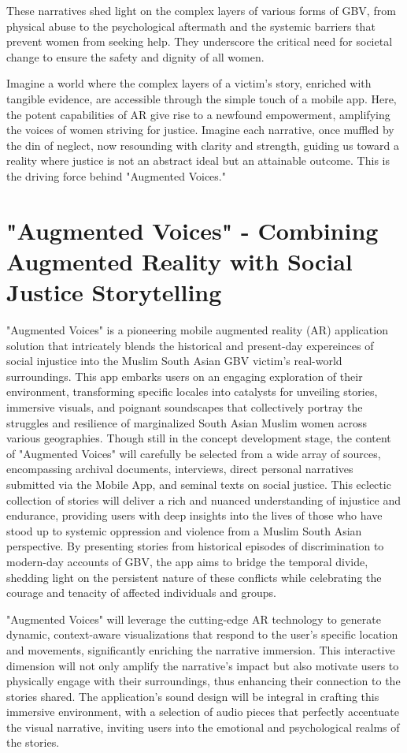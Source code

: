 \documentclass[manuscript,screen]{acmart}
\begin{document}
These narratives shed light on the complex layers of various forms of GBV, from physical abuse to the psychological aftermath and the systemic barriers that prevent women from seeking help. They underscore the critical need for societal change to ensure the safety and dignity of all women.

Imagine a world where the complex layers of a victim's story, enriched with tangible evidence, are accessible through the simple touch of a mobile app. Here, the potent capabilities of AR give rise to a newfound empowerment, amplifying the voices of women striving for justice. Imagine each narrative, once muffled by the din of neglect, now resounding with clarity and strength, guiding us toward a reality where justice is not an abstract ideal but an attainable outcome. This is the driving force behind "Augmented Voices."

\section{"Augmented Voices" - Combining Augmented Reality with Social Justice Storytelling}
"Augmented Voices" is a pioneering mobile augmented reality (AR) application solution that intricately blends the historical and present-day expereinces of social injustice into the Muslim South Asian GBV victim’s real-world surroundings. This app embarks users on an engaging exploration of their environment, transforming specific locales into catalysts for unveiling stories, immersive visuals, and poignant soundscapes that collectively portray the struggles and resilience of marginalized South Asian Muslim women across various geographies. Though still in the concept development stage, the content of "Augmented Voices" will carefully be selected from a wide array of sources, encompassing archival documents, interviews, direct personal narratives submitted via the Mobile App, and seminal texts on social justice. This eclectic collection of stories will deliver a rich and nuanced understanding of injustice and endurance, providing users with deep insights into the lives of those who have stood up to systemic oppression and violence from a Muslim South Asian perspective. By presenting stories from historical episodes of discrimination to modern-day accounts of GBV, the app aims to bridge the temporal divide, shedding light on the persistent nature of these conflicts while celebrating the courage and tenacity of affected individuals and groups. 

"Augmented Voices" will leverage the cutting-edge AR technology to generate dynamic, context-aware visualizations that respond to the user's specific location and movements, significantly enriching the narrative immersion. This interactive dimension will not only amplify the narrative's impact but also motivate users to physically engage with their surroundings, thus enhancing their connection to the stories shared. The application's sound design will be integral in crafting this immersive environment, with a selection of audio pieces that perfectly accentuate the visual narrative, inviting users into the emotional and psychological realms of the stories.
\end{document}
